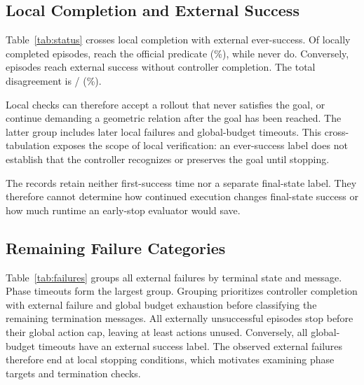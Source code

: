 \documentclass[letterpaper,10pt,conference]{ieeeconf}
\begin{document}
\subsection{Local Completion and External Success}
\label{sec:outcomes}
Table~\ref{tab:status} crosses local completion with external ever-success.
Of \ControllerCompleteCount{} locally completed episodes,
\CompletedExternalSuccessCount{} reach the official predicate
(\CompletionAgreementRate{}\%), while \ControllerFalsePositive{} never do.
Conversely, \ControllerMissedSuccess{} episodes reach external success
without controller completion. The total disagreement is
\DisagreementCount{}/\EpisodeCount{} (\DisagreementRate{}\%).

Local checks can therefore accept a rollout that never satisfies the goal,
or continue demanding a geometric relation after the goal has been reached.
The latter group includes later local failures and global-budget timeouts.
This cross-tabulation exposes the scope of local verification: an
ever-success label does not establish that the controller recognizes or
preserves the goal until stopping.

The records retain neither first-success time nor a separate final-state
label. They therefore cannot determine how continued execution changes
final-state success or how much runtime an early-stop evaluator would save.

\begin{table}[t]
\caption{Terminal controller state and independently recorded external
ever-success.
A controller failure can follow an earlier benchmark success.}
\label{tab:status}
\centering
\footnotesize

\end{table}

\subsection{Remaining Failure Categories}
Table~\ref{tab:failures} groups all \FailureCount{} external failures by
terminal state and message. Phase timeouts form the largest group.
Grouping prioritizes controller completion with external failure and global
budget exhaustion before classifying the remaining termination messages.
All \EarlyFailureCount{} externally unsuccessful episodes stop before their
global action cap, leaving at least \FailureMinUnusedSteps{} actions unused.
Conversely, all \GlobalTimeoutCount{} global-budget timeouts have an external
success label. The observed external failures therefore end at local stopping
conditions, which motivates examining phase targets and termination checks.
\end{document}

